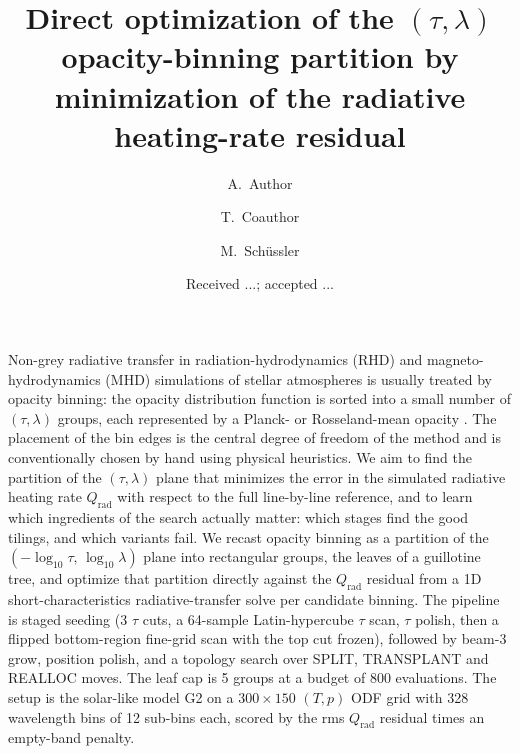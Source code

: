 \documentclass{aa}
\begin{document}
   \title{Direct optimization of the $(\tau,\lambda)$ opacity-binning partition
          by minimization of the radiative heating-rate residual}

   \author{A.~Author
           \and
           T.~Coauthor
           \and
           M.~Sch{\"u}ssler
           }


   \date{Received ...; accepted ...}

   \abstract
   {Non-grey radiative transfer in radiation-hydrodynamics (RHD) and
    magneto-hydrodynamics (MHD) simulations of stellar atmospheres is
    usually treated by opacity binning: the opacity distribution function
    is sorted into a small number of $(\tau,\lambda)$ groups, each
    represented by a Planck- or Rosseland-mean opacity \citep{nordlund1982,ludwig1992,vogler2004}.
    The placement of the bin edges is the central degree of freedom of the
    method and is conventionally chosen by hand using physical heuristics.}
   {We aim to find the partition of the
    $(\tau,\lambda)$ plane that minimizes the error in the
    simulated radiative heating rate $Q_\mathrm{rad}$ with respect to the
    full line-by-line reference, and to learn which ingredients of the
    search actually matter: which stages find the good tilings, and which
    variants fail.}
   {We recast opacity binning as a partition of the
    $(-\log_{10}\tau,\,\log_{10}\lambda)$ plane into rectangular groups,
    the leaves of a guillotine tree, and optimize that partition directly
    against the $Q_\mathrm{rad}$ residual from a 1D
    short-characteristics radiative-transfer solve per candidate binning.
    The pipeline is staged seeding (3 $\tau$ cuts, a 64-sample
    Latin-hypercube $\tau$ scan, $\tau$ polish, then a flipped
    bottom-region fine-grid scan with the top cut frozen), followed by
    beam-3 grow, position polish, and a topology search over
    SPLIT, TRANSPLANT and REALLOC moves. The leaf cap is 5 groups at a
    budget of 800 evaluations. The setup is the solar-like model
    G2 on a $300\times150$ $(T,p)$ ODF grid with 328 wavelength bins of
    12 sub-bins each, scored by the rms $Q_\mathrm{rad}$ residual times an
    empty-band penalty.}
\end{document}

